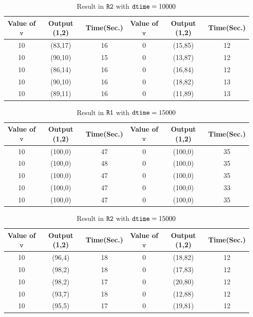 \documentclass{report}
\newcommand{\co}[1]{$\cod{#1}$}
\begin{document}
\begin{table}[t]
\centering
\begin{tabular}{|ccc||ccc|}
\hline
{\bf Value of} \co{v}& {\bf Output} (1,2)& {\bf Time}({\bf Sec.}) & 
{\bf Value of} \co{v}& {\bf Output} (1,2)& {\bf Time}({\bf Sec.})\\ \hline
10 & (83,17) & 16  & 0 & (15,85) & 12 \\
10 & (90,10) & 15  & 0 & (13,87) & 12 \\
10 & (86,14) & 16  & 0 & (16,84) & 12 \\
10 & (90,10) & 16  & 0 & (18,82) & 13 \\
10 & (89,11) & 16  & 0 & (11,89) & 13 \\
\hline
\end{tabular}
\caption{Result in \co{R2} with $\mathtt{dtime} = 10000$}
\label{table:r2:10000}
\end{table}

\begin{table}[t]
\centering
\begin{tabular}{|ccc||ccc|}
\hline
{\bf Value of} \co{v}& {\bf Output} (1,2)& {\bf Time}({\bf Sec.}) & 
{\bf Value of} \co{v}& {\bf Output} (1,2)& {\bf Time}({\bf Sec.})\\ \hline
10 & (100,0) & 47  & 0 & (100,0) & 35 \\
10 & (100,0) & 48  & 0 & (100,0) & 35 \\
10 & (100,0) & 47  & 0 & (100,0) & 35 \\
10 & (100,0) & 47  & 0 & (100,0) & 33 \\
10 & (100,0) & 47  & 0 & (100,0) & 35 \\
\hline
\end{tabular}
\caption{Result in \co{R1} with $\mathtt{dtime} = 15000$}
\label{table:r1:15000}
\end{table}

\begin{table}[t]
\centering
\begin{tabular}{|ccc||ccc|}
\hline
{\bf Value of} \co{v}& {\bf Output} (1,2)& {\bf Time}({\bf Sec.}) & 
{\bf Value of} \co{v}& {\bf Output} (1,2)& {\bf Time}({\bf Sec.})\\ \hline
10 & (96,4) & 18  & 0 & (18,82) & 12 \\
10 & (98,2) & 18  & 0 & (17,83) & 12 \\
10 & (98,2) & 17  & 0 & (20,80) & 12 \\
10 & (93,7) & 18  & 0 & (12,88) & 12 \\
10 & (95,5) & 17  & 0 & (19,81) & 12 \\
\hline
\end{tabular}
\caption{Result in \co{R2} with $\mathtt{dtime} = 15000$}
\label{table:r2:15000}
\end{table}
\end{document}
